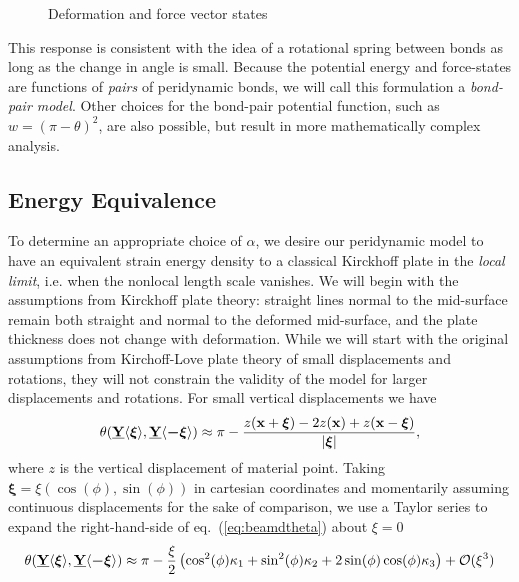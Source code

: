 \documentclass[preprint,review,12pt]{elsarticle}
\newcommand{\diagrampath}{./diagrams}
\newcommand\vstate[3]{%
	\mathbf{\underline{#1}}%
	\ifstrempty{#2}{}{[#2]}%
	\ifstrempty{#3}{}{\langle #3 \rangle}}
\begin{document}
%
%
\begin{figure}[tbp]
    \centering
    \subinputfrom{\diagrampath/}{bondPairV.eps_tex}
    \caption{Deformation and force vector states}
    \label{fig:Bondpair}
\end{figure}
%
This response is consistent with the idea of a rotational spring between bonds as long as the change in angle is small.  Because the potential energy and force-states are functions of \textit{pairs} of peridynamic bonds, we will call this formulation a \textit{bond-pair model}.  Other choices for the bond-pair potential function, such as \( w = (\pi - \theta)^2 \), are also possible, but result in more mathematically complex analysis.

\subsection{Energy Equivalence}
%
To determine an appropriate choice of $\alpha$, we desire our peridynamic model to have an equivalent strain energy density to a classical Kirckhoff plate in the \emph{local limit}, i.e. when the nonlocal length scale vanishes.  We will begin with the assumptions from Kirckhoff plate theory: straight lines normal to the mid-surface remain both straight and normal to the deformed mid-surface, and the plate thickness does not change with deformation.  While we will start with the original assumptions from Kirchoff-Love plate theory of small displacements and rotations, they will not constrain the validity of the model for larger displacements and rotations.  For small vertical displacements we have
%
\begin{equation}
    \theta(\vstate{Y}{}{\boldsymbol{\xi}},\vstate{Y}{}{\boldsymbol{-\xi}}) \approx \pi-\frac{z(\mathbf{x}+\boldsymbol{\xi})-2z(\mathbf{x})+z(\mathbf{x}-\boldsymbol{\xi})}{|\boldsymbol{\xi}|},
    \label{eq:beamdtheta}
\end{equation}
%
where $z$ is the vertical displacement of material point.  Taking \(\boldsymbol{\xi}=\xi (\cos(\phi),\sin(\phi))\) in cartesian coordinates and momentarily assuming continuous displacements for the sake of comparison, we use a Taylor series to expand the right-hand-side of eq.~(\ref{eq:beamdtheta}) about \(\xi = 0\) 
%
\begin{equation}
    \theta(\vstate{Y}{}{\boldsymbol{\xi}},\vstate{Y}{}{\boldsymbol{-\xi}}) \approx \pi-\frac{\xi}{2} \left(\cos^2(\phi) \kappa_1+\sin^2(\phi) \kappa_2+2\sin(\phi)\cos(\phi)\kappa_3\right)+\mathcal{O}(\xi^3)
    \label{eq:beamdtheta2}
\end{equation}
\end{document}
